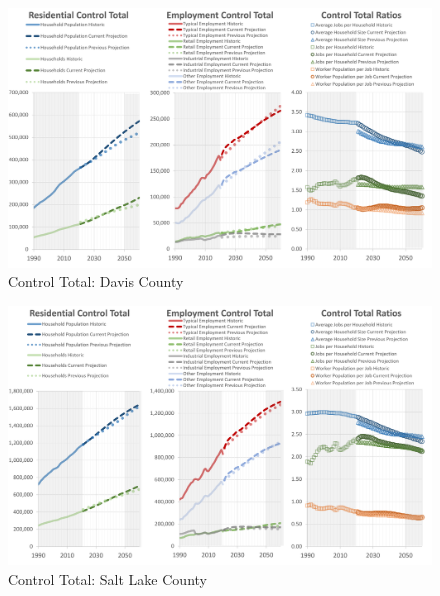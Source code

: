 \documentclass[
  letterpaper,
  DIV=11,
  numbers=noendperiod]{scrreprt}
\begin{document}
\begin{figure}[H]

{\centering \includegraphics{v9x/v900/whats-new/_pictures/pdf-control-davis.png}

}

\caption{\label{fig-pdf-control-davis}Control Total: Davis County}

\end{figure}

\begin{figure}[H]

{\centering \includegraphics{v9x/v900/whats-new/_pictures/pdf-control-sl.png}

}

\caption{\label{fig-pdf-control-sl}Control Total: Salt Lake County}

\end{figure}
\end{document}
